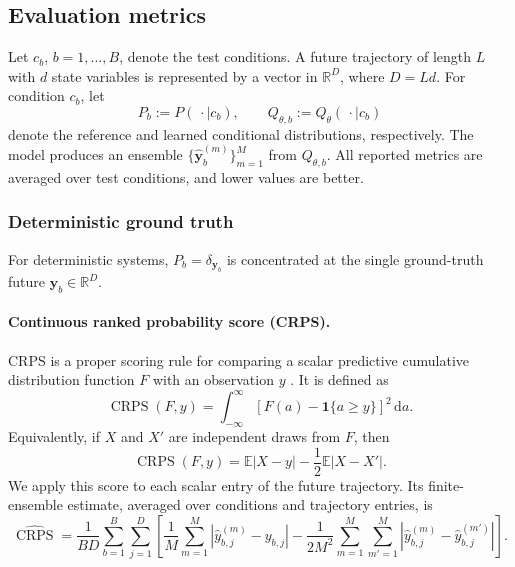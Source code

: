 \clearpage
\subsection{Evaluation metrics}
\label{sec:metrics}

Let $c_b$, $b=1,\ldots,B$, denote the test conditions.  A future trajectory
of length $L$ with $d$ state variables is represented by a vector in
$\mathbb{R}^{D}$, where $D=Ld$.  For condition $c_b$, let
\[
P_b := P(\,\cdot\mid c_b),
\qquad
Q_{\theta,b} := Q_\theta(\,\cdot\mid c_b)
\]
denote the reference and learned conditional distributions, respectively.
The model produces an ensemble
$\{\widehat{\mathbf y}_b^{(m)}\}_{m=1}^{M}$ from $Q_{\theta,b}$.
All reported metrics are averaged over test conditions, and lower values are
better.

\subsubsection{Deterministic ground truth}

For deterministic systems, $P_b=\delta_{\mathbf y_b}$ is concentrated at the
single ground-truth future $\mathbf y_b\in\mathbb{R}^{D}$.

\paragraph{Continuous ranked probability score (CRPS).}
CRPS is a proper scoring rule for comparing a scalar predictive cumulative
distribution function $F$ with an observation $y$
\citep{gneiting2007strictly}.  It is defined as
\begin{equation}
  \operatorname{CRPS}(F,y)
  =
  \int_{-\infty}^{\infty}
  \left[F(a)-\mathbf{1}\{a\geq y\}\right]^2\,\mathrm{d}a.
  \label{eq:crps-cdf}
\end{equation}
Equivalently, if $X$ and $X'$ are independent draws from $F$, then
\begin{equation}
  \operatorname{CRPS}(F,y)
  =
  \mathbb{E}|X-y|
  -\frac{1}{2}\mathbb{E}|X-X'|.
  \label{eq:crps-expectation}
\end{equation}
We apply this score to each scalar entry of the future trajectory.  Its
finite-ensemble estimate, averaged over conditions and trajectory entries, is
\begin{equation}
  \widehat{\operatorname{CRPS}}
  =
  \frac{1}{BD}\sum_{b=1}^{B}\sum_{j=1}^{D}
  \left[
    \frac{1}{M}\sum_{m=1}^{M}
    \left|\widehat y_{b,j}^{(m)}-y_{b,j}\right|
    -
    \frac{1}{2M^2}\sum_{m=1}^{M}\sum_{m'=1}^{M}
    \left|\widehat y_{b,j}^{(m)}-\widehat y_{b,j}^{(m')}\right|
  \right].
  \label{eq:crps-ensemble}
\end{equation}

